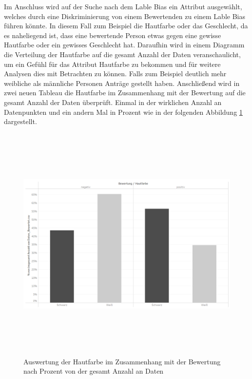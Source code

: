 \begin{onehalfspace}
Im Anschluss wird auf der Suche nach dem Lable Bias ein Attribut ausgewählt, welches durch eine Diskriminierung von einem Bewertenden zu einem Lable Bias führen könnte. In diesem Fall zum Beispiel die Hautfarbe oder das Geschlecht, da es naheliegend ist, dass eine bewertende Person etwas gegen eine gewisse Hautfarbe oder ein gewisses Geschlecht hat. Daraufhin wird in einem Diagramm die Verteilung der Hautfarbe auf die gesamt Anzahl der Daten veranschaulicht, um ein Gefühl für das Attribut Hautfarbe zu bekommen und für weitere Analysen dies mit Betrachten zu können. Falls zum Beispiel deutlich mehr weibliche als männliche Personen Anträge gestellt haben. Anschlie{\ss}end wird in zwei neuen Tableau die Hautfarbe im Zusammenhang mit der Bewertung auf die gesamt Anzahl der Daten überprüft. Einmal in der wirklichen Anzahl an Datenpunkten und ein andern Mal in Prozent wie in der folgenden Abbildung \ref{fig:TabHaut1} dargestellt.
\begin{figure}[!h]
    \centering
    \includegraphics[width=16cm,height=12cm]{Diagramme/Tab_Haut1.PNG}
    \caption{Auswertung der Hautfarbe im Zusammenhang mit der Bewertung nach Prozent von der gesamt Anzahl an Daten}
    \label{fig:TabHaut1}
\end{figure}\\

\end{onehalfspace}
